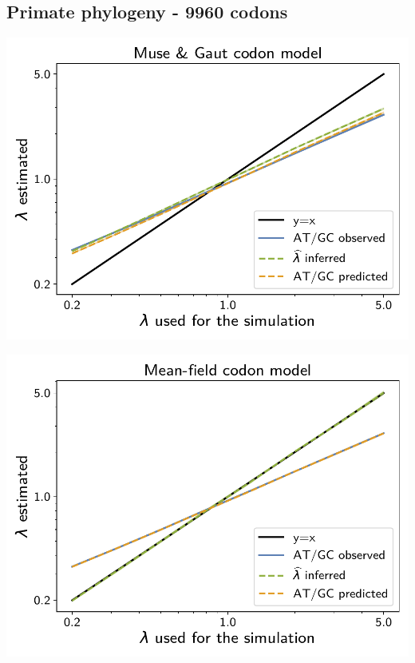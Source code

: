 \documentclass{article}
\begin{document}
\subsection{Primate phylogeny - 9960 codons}

\begin{center}
    \begin{minipage}{0.325\linewidth}
        \includegraphics[width=\linewidth, page=1]{inference_supp_mat/PrimatesExons20Mu1.0_lambda_MG.pdf}
    \end{minipage}
    \hfill
    \begin{minipage}{0.325\linewidth}
        \includegraphics[width=\linewidth, page=1]{inference_supp_mat/PrimatesExons20Mu1.0_lambda_MF.pdf}

\end{minipage}
\end{center}
\end{document}
